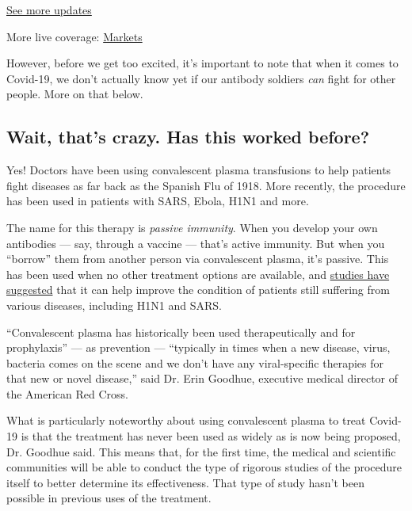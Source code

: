 \href{https://www.nytimes3xbfgragh.onion/2020/09/11/world/covid-19-coronavirus.html?action=click\&pgtype=Article\&state=default\&region=MAIN_CONTENT_1\&context=storylines_live_updates}{See
more updates}

More live coverage:
\href{https://www.nytimes3xbfgragh.onion/live/2020/09/11/business/stock-market-today-coronavirus?action=click\&pgtype=Article\&state=default\&region=MAIN_CONTENT_1\&context=storylines_live_updates}{Markets}

However, before we get too excited, it's important to note that when it
comes to Covid-19, we don't actually know yet if our antibody soldiers
\emph{can} fight for other people. More on that below.

\hypertarget{wait-thats-crazy-has-this-worked-before}{%
\subsection{Wait, that's crazy. Has this worked
before?}\label{wait-thats-crazy-has-this-worked-before}}

Yes! Doctors have been using convalescent plasma transfusions to help
patients fight diseases as far back as the Spanish Flu of 1918. More
recently, the procedure has been used in patients with SARS, Ebola, H1N1
and more.

The name for this therapy is \emph{passive immunity}. When you develop
your own antibodies --- say, through a vaccine --- that's active
immunity. But when you ``borrow'' them from another person via
convalescent plasma, it's passive. This has been used when no other
treatment options are available, and
\href{https://www.jci.org/articles/view/138003}{studies have suggested}
that it can help improve the condition of patients still suffering from
various diseases, including H1N1 and SARS.

``Convalescent plasma has historically been used therapeutically and for
prophylaxis'' --- as prevention --- ``typically in times when a new
disease, virus, bacteria comes on the scene and we don't have any
viral-specific therapies for that new or novel disease,'' said Dr. Erin
Goodhue, executive medical director of the American Red Cross.

What is particularly noteworthy about using convalescent plasma to treat
Covid-19 is that the treatment has never been used as widely as is now
being proposed, Dr. Goodhue said. This means that, for the first time,
the medical and scientific communities will be able to conduct the type
of rigorous studies of the procedure itself to better determine its
effectiveness. That type of study hasn't been possible in previous uses
of the treatment.

